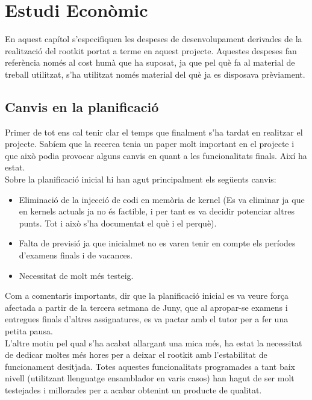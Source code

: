 \chapter{Estudi Econòmic} \label{cap:economic}

En aquest capítol s'especifiquen les despeses de desenvolupament derivades de la realització
del rootkit portat a terme en aquest projecte. Aquestes despeses fan referència només al cost humà que
ha suposat, ja que pel què fa al material de treball utilitzat, s'ha utilitzat només material del què
ja es disposava prèviament. \\

\section{Canvis en la planificació}

Primer de tot ens cal tenir clar el temps que finalment s'ha tardat en realitzar el projecte. Sabíem 
que la recerca tenia un paper molt important en el projecte i que això podia provocar alguns canvis 
en quant a les funcionalitats finals. Així ha estat. \\

Sobre la planificació inicial hi han agut principalment els següents canvis:

\begin{itemize}
    \item Eliminació de la injecció de codi en memòria de kernel (Es va eliminar ja que en kernels actuals ja no 
        és factible, i per tant es va decidir potenciar altres punts. Tot i això s'ha documentat el què i el perquè).
    \item Falta de previsió ja que inicialmet no es varen tenir en compte els períodes d'examens finals i de 
		vacances.
	\item Necessitat de molt més testeig.
\end{itemize}

Com a comentaris importants, dir que la planificació inicial es va veure força afectada a partir de la tercera setmana de Juny, que al apropar-se
examens i entregues finals d'altres assignatures, es va pactar amb el tutor per a fer una petita pausa. \\

L'altre motiu pel qual s'ha acabat allargant una mica més, ha estat la necessitat de dedicar moltes més hores per a 
deixar el rootkit amb l'estabilitat de funcionament desitjada. Totes aquestes funcionalitats programades a tant 
baix nivell (utilitzant llenguatge ensamblador en varis casos) han hagut de ser molt testejades i millorades per a
acabar obtenint un producte de qualitat. \\

